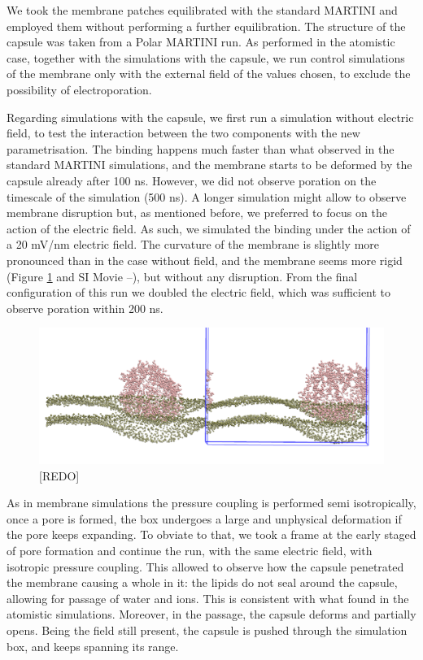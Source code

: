 We took the membrane patches equilibrated with the standard MARTINI and employed them without performing a further equilibration. The structure of the capsule was taken from a Polar MARTINI run. As performed in the atomistic case, together with the simulations with the capsule, we run control simulations of the membrane only with the external field of the values chosen, to exclude the possibility of electroporation.

Regarding simulations with the capsule, we first run a simulation without electric field, to test the interaction between the two components with the new parametrisation. The binding happens much faster than what observed in the standard MARTINI simulations, and the membrane starts to be deformed by the capsule already after 100 ns. However, we did not observe poration on the timescale of the simulation (500 ns). A longer simulation might allow to observe membrane disruption but, as mentioned before, we preferred to focus on the action of the electric field. As such, we simulated the binding under the action of a 20 mV/nm electric field. The curvature of the membrane is slightly more pronounced than in the case without field, and the membrane seems more rigid (Figure \ref{fig:martini_stMem} and SI Movie --), but without any disruption. From the final configuration of this run we doubled the electric field, which was sufficient to observe poration within 200 ns.

\begin{figure}[t!]
\centering\includegraphics[width=0.95\linewidth]{3results_capsule/pics/picmartiniPW.png} 
\caption[MARTINI simulations of capsule on membrane]{[REDO]}
\label{fig:martini_stMem}
\end{figure}

As in membrane simulations the pressure coupling is performed semi isotropically, once a pore is formed, the box undergoes a large and unphysical deformation if the pore keeps expanding. To obviate to that, we took a frame at the early staged of pore formation and continue the run, with the same electric field, with isotropic pressure coupling. This allowed to observe how the capsule penetrated the membrane causing a whole in it: the lipids do not seal around the capsule, allowing for passage of water and ions. This is consistent with what found in the atomistic simulations. Moreover, in the passage, the capsule deforms and partially opens.
%
Being the field still present, the capsule is pushed through the simulation box, and keeps spanning its range.

